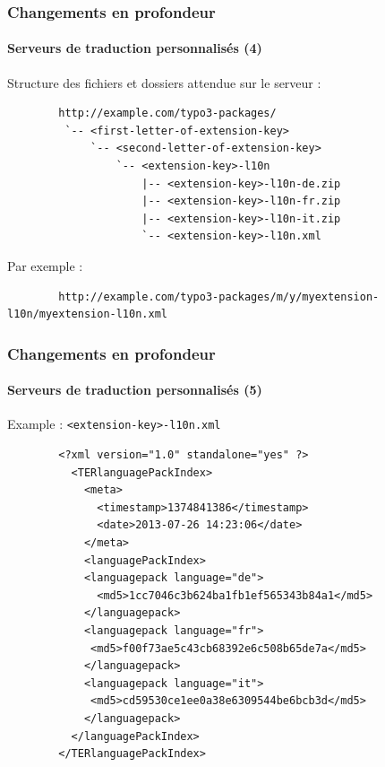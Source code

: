 
\begin{frame}[fragile]
	\frametitle{Changements en profondeur}
	\framesubtitle{Serveurs de traduction personnalisés (4)}

	Structure des fichiers et dossiers attendue sur le serveur :

	\begin{lstlisting}
		http://example.com/typo3-packages/
		 `-- <first-letter-of-extension-key>
		     `-- <second-letter-of-extension-key>
		         `-- <extension-key>-l10n
		             |-- <extension-key>-l10n-de.zip
		             |-- <extension-key>-l10n-fr.zip
		             |-- <extension-key>-l10n-it.zip
		             `-- <extension-key>-l10n.xml
	\end{lstlisting}

	Par exemple :

	\begin{lstlisting}
		http://example.com/typo3-packages/m/y/myextension-l10n/myextension-l10n.xml
	\end{lstlisting}

\end{frame}


\begin{frame}[fragile]
	\frametitle{Changements en profondeur}
	\framesubtitle{Serveurs de traduction personnalisés (5)}

	Example : \texttt{<extension-key>-l10n.xml}

	\lstset{
		basicstyle=\tiny\ttfamily
	}

	\begin{lstlisting}
		<?xml version="1.0" standalone="yes" ?>
		  <TERlanguagePackIndex>
		    <meta>
		      <timestamp>1374841386</timestamp>
		      <date>2013-07-26 14:23:06</date>
		    </meta>
		    <languagePackIndex>
		    <languagepack language="de">
		      <md5>1cc7046c3b624ba1fb1ef565343b84a1</md5>
		    </languagepack>
		    <languagepack language="fr">
		     <md5>f00f73ae5c43cb68392e6c508b65de7a</md5>
		    </languagepack>
		    <languagepack language="it">
		     <md5>cd59530ce1ee0a38e6309544be6bcb3d</md5>
		    </languagepack>
		  </languagePackIndex>
		</TERlanguagePackIndex>
	\end{lstlisting}

\end{frame}


